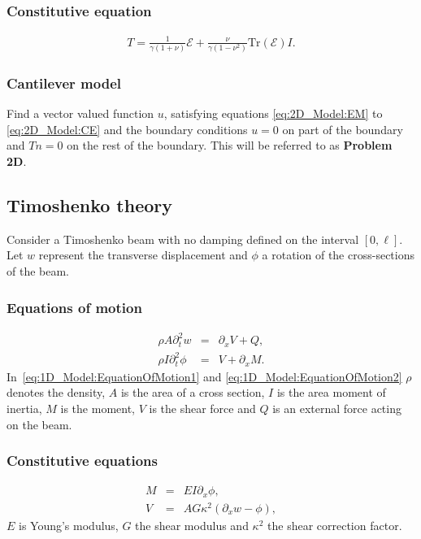 			\subsubsection*{Constitutive equation}\label{sssec:2D_Model:ConstitutiveEquation}
			\begin{eqnarray}
				T = \frac{1}{\gamma(1+\nu)}\mathcal{E} + \frac{\nu}{\gamma(1-\nu^2)}\textrm{Tr}(\mathcal{E}) I. \label{eq:2D_Model:CE}
			\end{eqnarray}

		\subsubsection*{Cantilever model}

			Find a vector valued function $u$, satisfying equations \eqref{eq:2D_Model:EM} to \eqref{eq:2D_Model:CE} and the boundary conditions $u = 0$ on part of the boundary and $Tn = 0$ on the rest of the boundary. This will be referred to as \textbf{Problem 2D}.


	\subsection{Timoshenko theory}
		Consider a Timoshenko beam with no damping defined on the interval $[0,\ell]$.
		Let $w$ represent the transverse displacement and $\phi$ a rotation of the cross-sections of the beam.

		\subsubsection*{Equations of motion}\label{sssec:1D_Model:EquationOfMotion}
			\begin{eqnarray}
				\rho A \partial_t^2 w &=& \partial_x V + Q, \label{eq:1D_Model:EquationOfMotion1}\\
				\rho I\partial_t^2 \phi  &=& V + \partial_x M. \label{eq:1D_Model:EquationOfMotion2}
			\end{eqnarray}\label{sym:A}\label{sym:V}\label{sym:Iinertia}\label{sym:M}\label{sym:phiT}
			In~\eqref{eq:1D_Model:EquationOfMotion1} and \eqref{eq:1D_Model:EquationOfMotion2} $\rho$ denotes the density, $A$ is the area of a cross section, $I$ is the area moment of inertia, $M$ is the moment, $V$ is the shear force and $Q$ is an external force acting on the beam.

		\subsubsection*{Constitutive equations}\label{sssec:1D_Model:ConstitutiveEquation}
			\begin{eqnarray}
				M &=& EI\partial_x \phi, \label{eq:1D_Model:ConstitutiveEquations1}\\
				V &=& AG\kappa^2(\partial_x w - \phi), \label{eq:1D_Model:ConstitutiveEquations2}\label{sym:kappa2T}
			\end{eqnarray}
			$E$ is Young's modulus, $G$ the shear modulus and $\kappa^2$ the shear correction factor.

